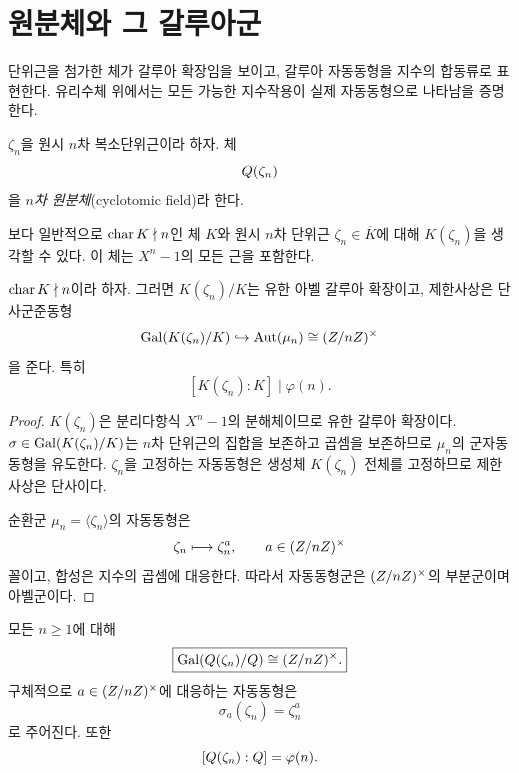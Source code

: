 \clearpage
\section{원분체와 그 갈루아군}
\label{sec:cyclotomic-fields}

\begin{learninggoal}
단위근을 첨가한 체가 갈루아 확장임을 보이고, 갈루아 자동동형을 지수의 합동류로 표현한다. 유리수체 위에서는 모든 가능한 지수작용이 실제 자동동형으로 나타남을 증명한다.
\end{learninggoal}

\begin{definition}[원분체]
$\zeta_n$을 원시 $n$차 복소단위근이라 하자. 체
\[
  Q(\zeta_n)
\]
을 \emph{$n$차 원분체}(cyclotomic field)라 한다.
\end{definition}

보다 일반적으로 $\operatorname{char} K\nmid n$인 체 $K$와 원시 $n$차 단위근 $\zeta_n\in\overline K$에 대해 $K(\zeta_n)$을 생각할 수 있다. 이 체는 $X^n-1$의 모든 근을 포함한다.

\begin{theorem}
\label{thm:general-root-unity-extension}
$\operatorname{char} K\nmid n$이라 하자. 그러면 $K(\zeta_n)/K$는 유한 아벨 갈루아 확장이고, 제한사상은 단사군준동형
\[
  \operatorname{Gal}(K(\zeta_n)/K)
  \hookrightarrow\operatorname{Aut}(\mu_n)
  \cong(Z/nZ)^\times
\]
을 준다. 특히
\[
  [K(\zeta_n):K]\mid\varphi(n).
\]
\end{theorem}

\begin{proof}
$K(\zeta_n)$은 분리다항식 $X^n-1$의 분해체이므로 유한 갈루아 확장이다. $\sigma\in\operatorname{Gal}(K(\zeta_n)/K)$는 $n$차 단위근의 집합을 보존하고 곱셈을 보존하므로 $\mu_n$의 군자동동형을 유도한다. $\zeta_n$을 고정하는 자동동형은 생성체 $K(\zeta_n)$ 전체를 고정하므로 제한사상은 단사이다.

순환군 $\mu_n=\langle\zeta_n\rangle$의 자동동형은
\[
  \zeta_n\longmapsto\zeta_n^a,
  \qquad a\in(Z/nZ)^\times
\]
꼴이고, 합성은 지수의 곱셈에 대응한다. 따라서 자동동형군은 $(Z/nZ)^\times$의 부분군이며 아벨군이다.
\end{proof}

\begin{theorem}
\label{thm:cyclotomic-galois-group-Q}
모든 $n\ge1$에 대해
\[
  \boxed{
  \operatorname{Gal}(Q(\zeta_n)/Q)
  \cong(Z/nZ)^\times.}
\]
구체적으로 $a\in(Z/nZ)^\times$에 대응하는 자동동형은
\[
  \sigma_a(\zeta_n)=\zeta_n^a
\]
로 주어진다. 또한
\[
  [Q(\zeta_n):Q]=\varphi(n).
\]
\end{theorem}

